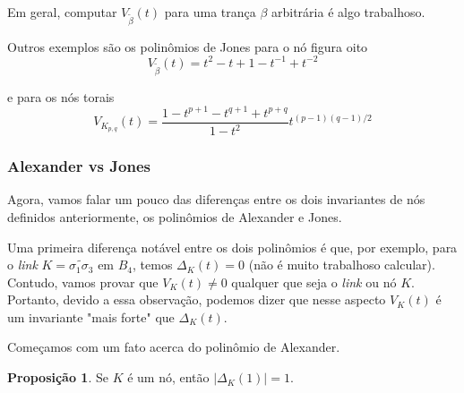 \documentclass[a4paper,portuguese,11pt,twoside, leqno]{book}
\theoremstyle{definition}
\newtheorem{prop}{Proposição}[section]
\begin{document}
	\par\vspace{0.3cm} Em geral, computar $V_{\widetilde{\beta}}(t)$ para uma trança $\beta$ arbitrária é algo trabalhoso.
	\par\vspace{0.3cm} Outros exemplos são os polinômios de Jones para o nó figura oito 
	\begin{equation*}
	V_{\widetilde{\beta}}(t) = t^2 - t + 1 - t^{-1} + t^{-2}  
	\end{equation*}
	\par\vspace{0.3cm} e para os nós torais
	\begin{equation*}
	V_{K_{p,q}}(t) = \frac{1-t^{p+1}-t^{q+1} + t^{p+q}}{1-t^2}t^{(p-1)(q-1)/2}
	\end{equation*}
	\subsubsection{Alexander vs Jones}
	\hspace{12pt} Agora, vamos falar um pouco das diferenças entre os dois invariantes de nós definidos anteriormente, os polinômios de Alexander e Jones.
	\par\vspace{0.3cm} Uma primeira diferença notável entre os dois polinômios é que, por exemplo, para o \textit{link} $K = \widetilde{\sigma_1\sigma_3}$ em $B_4$, temos $\Delta_K(t) = 0$ (não é muito trabalhoso calcular). Contudo, vamos provar que $V_K(t)\neq 0$ qualquer que seja o \textit{link} ou nó $K$. Portanto, devido a essa observação, podemos dizer que nesse aspecto $V_K(t)$ é um invariante "mais forte" que $\Delta_K(t)$. 
	\par\vspace{0.3cm} Começamos com um fato acerca do polinômio de Alexander.
	\begin{prop}
		\label{polinomio de Alexander para t=1}
		Se $K$ é um nó, então $|\Delta_K(1)|=1$.
	\end{prop}
\end{document}
